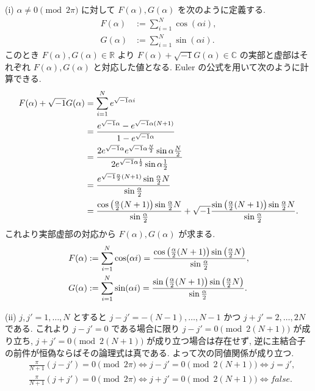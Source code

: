 \documentclass[uplatex,dvipdfmx,a4paper,11pt]{jlreq}
\newcommand{\CC}{\mathbb{C}}
\newcommand{\RR}{\mathbb{R}}
\theoremstyle{definition}
\begin{document}
(i) $\alpha \neq 0 \pmod{2\pi}$ に対して $F(\alpha), G(\alpha)$ を次のように定義する.
\begin{align}
  F(\alpha) & := \sum_{i=1}^{N}\cos(\alpha i), \\
  G(\alpha) & := \sum_{i=1}^{N}\sin(\alpha i).
\end{align}
このとき $F(\alpha), G(\alpha)\in\RR$ より $F(\alpha) + \sqrt{-1}G(\alpha)\in\CC$ の実部と虚部はそれぞれ $F(\alpha), G(\alpha)$ と対応した値となる. Euler の公式を用いて次のように計算できる.
\begin{align}
  F(\alpha) + \sqrt{-1}G(\alpha) & = \sum_{i=1}^{N}e^{\sqrt{-1}\alpha i}                                                                                                                                                     \\
                                 & = \frac{e^{\sqrt{-1}\alpha} - e^{\sqrt{-1}\alpha (N+1)}}{1 - e^{\sqrt{-1}\alpha}}                                                                                                         \\
                                 & = \frac{2e^{\sqrt{-1}\alpha}e^{\sqrt{-1}\alpha \frac{N}{2}}\sin{\alpha \frac{N}{2}}}{2e^{\sqrt{-1}\alpha\frac{1}{2}}\sin{\alpha\frac{1}{2}}}                                              \\
                                 & = \frac{e^{\sqrt{-1}\frac{\alpha}{2}(N+1)}\sin{\frac{\alpha}{2}N}}{\sin{\frac{\alpha}{2}}}                                                                                                \\
                                 & = \frac{\cos\qty(\frac{\alpha}{2}(N+1))\sin{\frac{\alpha}{2}N}}{\sin{\frac{\alpha}{2}}} + \sqrt{-1}\frac{\sin\qty(\frac{\alpha}{2}(N+1))\sin{\frac{\alpha}{2}N}}{\sin{\frac{\alpha}{2}}}.
\end{align}
これより実部虚部の対応から $F(\alpha), G(\alpha)$ が求まる.
\begin{align}
  F(\alpha) & := \sum_{i=1}^{N}\cos(\alpha i) = \frac{\cos\qty(\frac{\alpha}{2}(N+1))\sin\qty(\frac{\alpha}{2}N)}{\sin{\frac{\alpha}{2}}}, \\
  G(\alpha) & := \sum_{i=1}^{N}\sin(\alpha i) = \frac{\sin\qty(\frac{\alpha}{2}(N+1))\sin\qty(\frac{\alpha}{2}N)}{\sin{\frac{\alpha}{2}}}.
\end{align}

(ii) $j, j' = 1,\ldots,N$ とすると $j - j' = -(N - 1),\ldots,N - 1$ かつ $j + j' = 2,\ldots,2N$ である. これより $j - j' = 0$ である場合に限り $j - j' = 0 \pmod{2(N+1)}$ が成り立ち, $j + j' = 0 \pmod{2(N+1)}$ が成り立つ場合は存在せず, 逆に主結合子の前件が恒偽ならばその論理式は真である. よって次の同値関係が成り立つ.
\begin{align}
   & \frac{\pi}{N+1}(j - j') = 0 \pmod{2\pi} \iff j - j' = 0 \pmod{2(N+1)} \iff j = j', \label{Q17-3. ii-1} \\
   & \frac{\pi}{N+1}(j + j') = 0 \pmod{2\pi} \iff j + j' = 0 \pmod{2(N+1)} \iff false. \label{Q17-3. ii-2}
\end{align}
\end{document}
